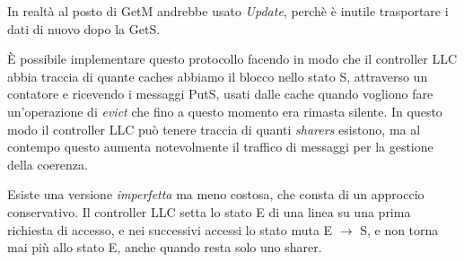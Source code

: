\begin{warn}
    In realtà al posto di GetM andrebbe usato \textit{Update}, perchè è inutile trasportare i dati di nuovo dopo la GetS.
\end{warn}

\begin{figure}[ht]
    \centering
    \setlength{\fboxrule}{0.5pt} %
    \setlength{\fboxsep}{0pt}    %
\end{figure}

\noindent \uppercase{è} possibile implementare questo protocollo facendo in modo che il controller LLC abbia traccia di quante caches abbiamo il blocco nello stato S, attraverso un contatore e ricevendo i messaggi PutS, usati dalle cache quando vogliono fare un'operazione di \textit{evict} che fino a questo momento era rimasta silente. In questo modo il controller LLC può tenere traccia di quanti \textit{sharers} esistono, ma al contempo questo aumenta notevolmente il traffico di messaggi per la gestione della coerenza. 

\noindent Esiste una versione \textit{imperfetta} ma meno costosa, che consta di un approccio conservativo. Il controller LLC setta lo stato E di una linea su una prima richiesta di accesso, e nei successivi accessi lo stato muta E $\rightarrow$ S, e non torna mai più allo stato E, anche quando resta solo uno sharer.  

\begin{figure}[ht]
    \centering
    \setlength{\fboxrule}{0.5pt} %
    \setlength{\fboxsep}{0pt}    %
\end{figure}

